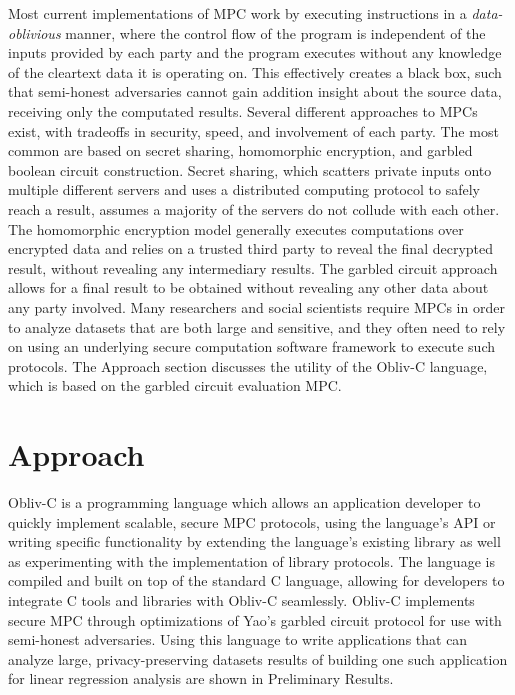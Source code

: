 \documentclass[conference]{IEEEtran}
\begin{document}
Most current implementations of MPC work by executing instructions in a \emph{data-oblivious} manner, where the control flow of the program is independent of the 
inputs provided by each party and the program executes without any 
knowledge of the cleartext data it is operating on.
This effectively creates a black box, such that semi-honest adversaries 
cannot gain addition insight about the source data, receiving only the computated results.
Several different approaches to MPCs exist, with tradeoffs in security, speed, and
involvement of each party. The most common are based on secret sharing, homomorphic
encryption, and garbled boolean circuit construction. 
Secret sharing, which scatters private inputs onto multiple different 
servers and uses a distributed computing protocol to safely reach a result, 
assumes a majority of the servers do not collude with each other. 
The homomorphic encryption model generally executes computations over
encrypted data and relies on a trusted third party to reveal the final decrypted result,
without revealing any intermediary results. The garbled circuit approach allows for
a final result to be obtained without revealing any other data about any party involved.
Many researchers and social scientists require MPCs in order to analyze datasets that are 
both large and sensitive, and they often need to rely on using an underlying 
secure computation software framework to execute such protocols.
The Approach section discusses the utility of the Obliv-C language, which is based on 
the garbled circuit evaluation MPC.

\section{Approach}
Obliv-C is a programming language which allows an application developer to
quickly implement scalable, secure MPC protocols, using the language’s 
API or writing specific functionality by extending the language's existing library as
well as experimenting with the implementation of library 
protocols\cite{cryptoeprint:2015:1153}. The language is compiled and built 
on top of the standard C language, allowing for developers to 
integrate C tools and libraries with Obliv-C seamlessly.
Obliv-C implements secure MPC through optimizations of Yao's garbled circuit protocol 
for use with semi-honest adversaries. Using this language to write applications 
that can analyze large, privacy-preserving datasets 
results of building one such application for linear regression analysis 
are shown in Preliminary Results.
\end{document}

